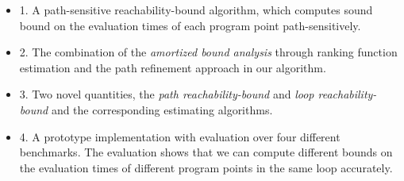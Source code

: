 \begin{itemize}
  \item 
1. A path-sensitive reachability-bound algorithm, which computes sound bound on the evaluation times of each program point path-sensitively.
 \item 
2. The combination of the \emph{amortized bound analysis} through ranking function estimation and the path refinement approach in our algorithm.
\item 
3. Two novel quantities, the \emph{path reachability-bound} and \emph{loop reachability-bound} and the corresponding estimating algorithms.
\item 
4. A prototype implementation with evaluation over four different benchmarks.
  The evaluation shows that we can compute different bounds on the evaluation times of different program points in the same loop accurately.
\end{itemize}